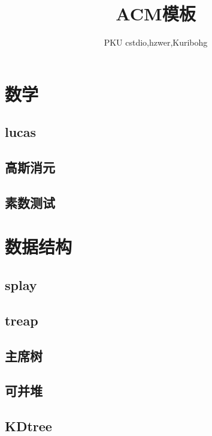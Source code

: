 \documentclass[UTF8,a4paper]{ctexart}
\author{PKU cstdio,hzwer,Kuribohg}
\title{\Huge ACM模板}
\begin{document}
 
\maketitle
\tableofcontents
\section{数学}



\subsection{lucas}

\subsection{高斯消元}







\subsection{素数测试}

\section{数据结构}

\subsection{splay}

\subsection{treap}

\subsection{主席树}

\subsection{可并堆}

\subsection{KDtree}
\end{document}
